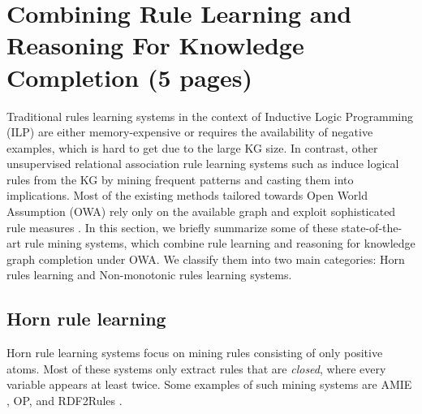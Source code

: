 \section{Combining Rule Learning and Reasoning For Knowledge Completion (5 pages)}
\label{sec:rules_kg_completion}
Traditional rules learning systems in the context of Inductive Logic Programming (ILP) \cite{probfoil,DBLP:conf/ijcai/RaedtDTBV15,DBLP:conf/clima/CorapiSIR11} are either memory-expensive or requires the availability of negative examples, which is hard to get due to the large KG size. In contrast, other unsupervised relational 
association rule learning systems such as \cite{DBLP:conf/esf/GoethalsB02,amie} induce logical rules from the KG by mining frequent patterns and casting them into implications. Most of the  existing methods tailored towards Open World Assumption (OWA) rely only on the available graph and exploit sophisticated rule measures \cite{amie,op,rumis}.
In this section, we briefly summarize some of these state-of-the-art rule mining systems, which combine rule learning and reasoning for knowledge graph completion under OWA. We classify them into two main categories: Horn rules learning and Non-monotonic rules learning systems.
\subsection{Horn rule learning}
Horn rule learning systems focus on mining rules consisting of only positive atoms. Most of these systems only extract rules that are \emph{closed}, where every variable appears at least twice. Some examples of such mining systems are AMIE \cite{amie}, OP, \cite{op} and RDF2Rules \cite{rdf2rules}.
